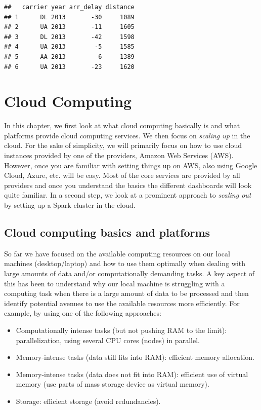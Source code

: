 \documentclass[
  12pt,
]{style/krantz}
\providecommand{\tightlist}{%
  \setlength{\itemsep}{0pt}\setlength{\parskip}{0pt}}
\begin{document}
\begin{verbatim}
##   carrier year arr_delay distance
## 1      DL 2013       -30     1089
## 2      UA 2013       -11     1605
## 3      DL 2013       -42     1598
## 4      UA 2013        -5     1585
## 5      AA 2013         6     1389
## 6      UA 2013       -23     1620
\end{verbatim}

\hypertarget{cloud-computing}{%
\chapter{Cloud Computing}\label{cloud-computing}}

In this chapter, we first look at what cloud computing basically is and what platforms provide cloud computing services. We then focus on \emph{scaling up} in the cloud. For the sake of simplicity, we will primarily focus on how to use cloud instances provided by one of the providers, Amazon Web Services (AWS). However, once you are familiar with setting things up on AWS, also using Google Cloud, Azure, etc. will be easy. Most of the core services are provided by all providers and once you understand the basics the different dashboards will look quite familiar. In a second step, we look at a prominent approach to \emph{scaling out} by setting up a Spark cluster in the cloud.

\hypertarget{cloud-computing-basics-and-platforms}{%
\section{Cloud computing basics and platforms}\label{cloud-computing-basics-and-platforms}}

So far we have focused on the available computing resources on our local machines (desktop/laptop) and how to use them optimally when dealing with large amounts of data and/or computationally demanding tasks. A key aspect of this has been to understand why our local machine is struggling with a computing task when there is a large amount of data to be processed and then identify potential avenues to use the available resources more efficiently. For example, by using one of the following approaches:

\begin{itemize}
\tightlist
\item
  Computationally intense tasks (but not pushing RAM to the limit): parallelization, using several CPU cores (nodes) in parallel.
\item
  Memory-intense tasks (data still fits into RAM): efficient memory allocation.
\item
  Memory-intense tasks (data does not fit into RAM): efficient use of virtual memory (use parts of mass storage device as virtual memory).
\item
  Storage: efficient storage (avoid redundancies).
\end{itemize}
\end{document}
